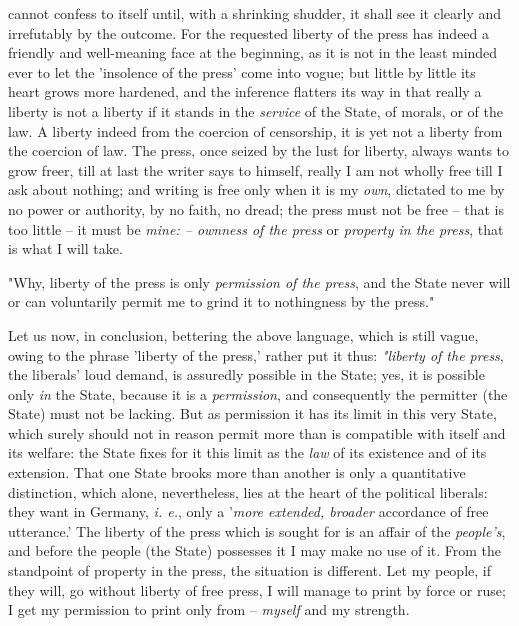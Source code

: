 \documentclass[a4paper]{book}
\begin{document}
cannot confess to itself until, with a shrinking shudder, it shall see it 
clearly and irrefutably by the outcome. For the requested liberty of the press 
has indeed a friendly and well-meaning face at the beginning, as it is not in 
the least minded ever to let the 'insolence of the press' come into vogue; but 
little by little its heart grows more hardened, and the inference flatters its 
way in that really a liberty is not a liberty if it stands in the 
\textit{service} of the State, of morals, or of the law. A liberty indeed from 
the coercion of censorship, it is yet not a liberty from the coercion of law. 
The press, once seized by the lust for liberty, always wants to grow freer, 
till at last the writer says to himself, really I am not wholly free till I 
ask about nothing; and writing is free only when it is my \textit{own}, 
dictated to me by no power or authority, by no faith, no dread; the press must 
not be free -- that is too little -- it must be \textit{mine: -- ownness of 
the press} or \textit{property in the press}, that is what I will take.

"{}Why, liberty of the press is only \textit{permission of the press}, and the 
State never will or can voluntarily permit me to grind it to nothingness by 
the press."{}

Let us now, in conclusion, bettering the above language, which is still vague, 
owing to the phrase 'liberty of the press,' rather put it thus: 
\textit{"{}liberty of the press}, the liberals' loud demand, is assuredly 
possible in the State; yes, it is possible only \textit{in} the State, because 
it is a \textit{permission}, and consequently the permitter (the State) must 
not be lacking. But as permission it has its limit in this very State, which 
surely should not in reason permit more than is compatible with itself and its 
welfare: the State fixes for it this limit as the \textit{law} of its 
existence and of its extension. That one State brooks more than another is 
only a quantitative distinction, which alone, nevertheless, lies at the heart 
of the political liberals: they want in Germany, \textit{i. e.}, only a 
'\textit{more extended, broader} accordance of free utterance.' The liberty of 
the press which is sought for is an affair of the \textit{people's}, and 
before the people (the State) possesses it I may make no use of it. From the 
standpoint of property in the press, the situation is different. Let my 
people, if they will, go without liberty of free press, I will manage to print 
by force or ruse; I get my permission to print only from -- \textit{myself} 
and my strength.
\end{document}
